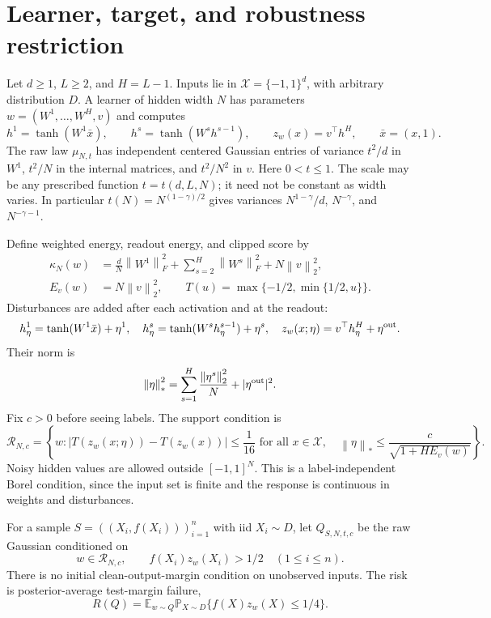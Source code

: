 \documentclass[11pt]{article}
\newcommand{\E}{\mathbb E}
\newcommand{\Prb}{\mathbb P}
\newcommand{\norm}[1]{\left\|#1\right\|}
\begin{document}
\section{Learner, target, and robustness restriction}

Let $d\ge1$, $L\ge2$, and $H=L-1$. Inputs lie in
$\mathcal X=\{-1,1\}^d$, with arbitrary distribution $D$.
A learner of hidden width $N$ has parameters $w=(W^1,\ldots,W^H,v)$ and
computes
\[
 h^1=\tanh(W^1\bar x),\qquad
 h^s=\tanh(W^sh^{s-1}),\qquad
 z_w(x)=v^\top h^H,\qquad \bar x=(x,1).
\]
The raw law $\mu_{N,t}$ has independent centered Gaussian entries of
variance $t^2/d$ in $W^1$, $t^2/N$ in the internal matrices, and
$t^2/N^2$ in $v$. Here $0<t\le1$. The scale may be any prescribed
function $t=t(d,L,N)$; it need not be constant as width varies.
In particular $t(N)=N^{(1-\gamma)/2}$ gives variances
$N^{1-\gamma}/d$, $N^{-\gamma}$, and $N^{-\gamma-1}$.

Define weighted energy, readout energy, and clipped score by
\begin{align*}
 \kappa_N(w)&=\frac dN\norm{W^1}_F^2+
   \sum_{s=2}^H\norm{W^s}_F^2+N\norm v_2^2,\\
 E_v(w)&=N\norm v_2^2,\qquad
 T(u)=\max\{-1/2,\min\{1/2,u\}\}.
\end{align*}
Disturbances are added after each activation and at the readout:
\[
 h^1_\eta=\tanh(W^1\bar x)+\eta^1,\quad
 h^s_\eta=\tanh(W^sh^{s-1}_\eta)+\eta^s,\quad
 z_w(x;\eta)=v^\top h^H_\eta+\eta^{\rm out}.
\]
Their norm is
\[
 \norm\eta_*^2=\sum_{s=1}^H\frac{\norm{\eta^s}_2^2}{N}
                  +|\eta^{\rm out}|^2.
\]
Fix $c>0$ before seeing labels. The support condition is
\begin{equation}\label{eq:support}
 \mathcal R_{N,c}=\left\{w:
 |T(z_w(x;\eta))-T(z_w(x))|\le\frac1{16}
 \text{ for all }x\in\mathcal X,\quad
 \norm\eta_*\le\frac c{\sqrt{1+HE_v(w)}}\right\}.
\end{equation}
Noisy hidden values are allowed outside $[-1,1]^N$.
This is a label-independent Borel condition, since the input set is finite
and the response is continuous in weights and disturbances.

For a sample $S=((X_i,f(X_i)))_{i=1}^n$ with iid $X_i\sim D$, let
$Q_{S,N,t,c}$ be the raw Gaussian conditioned on
\begin{equation}\label{eq:conditioning}
 w\in\mathcal R_{N,c},\qquad
 f(X_i)z_w(X_i)>1/2\quad(1\le i\le n).
\end{equation}
There is no initial clean-output-margin condition on unobserved inputs.
The risk is posterior-average test-margin failure,
\[
 R(Q)=\E_{w\sim Q}\Prb_{X\sim D}\{f(X)z_w(X)\le1/4\}.
\]
\end{document}

